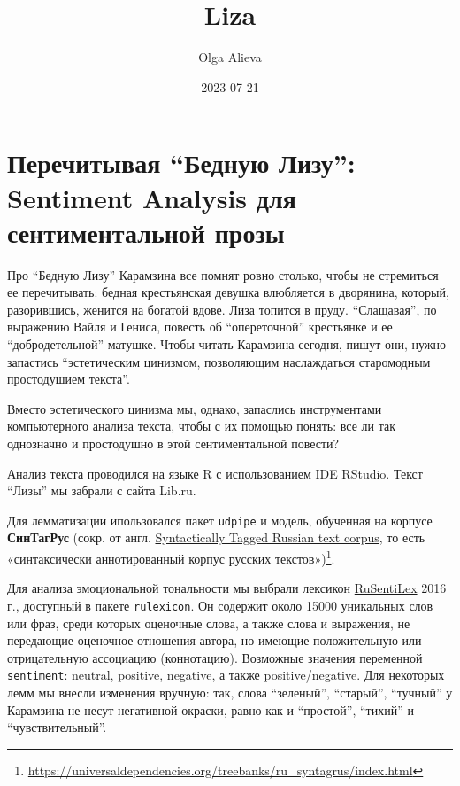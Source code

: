 \documentclass[
]{article}
\title{Liza}
\author{Olga Alieva}
\date{2023-07-21}
\begin{document}
\maketitle

\hypertarget{ux43fux435ux440ux435ux447ux438ux442ux44bux432ux430ux44f-ux431ux435ux434ux43dux443ux44e-ux43bux438ux437ux443-sentiment-analysis-ux434ux43bux44f-ux441ux435ux43dux442ux438ux43cux435ux43dux442ux430ux43bux44cux43dux43eux439-ux43fux440ux43eux437ux44b}{%
\section{Перечитывая ``Бедную Лизу'': Sentiment Analysis для
сентиментальной
прозы}\label{ux43fux435ux440ux435ux447ux438ux442ux44bux432ux430ux44f-ux431ux435ux434ux43dux443ux44e-ux43bux438ux437ux443-sentiment-analysis-ux434ux43bux44f-ux441ux435ux43dux442ux438ux43cux435ux43dux442ux430ux43bux44cux43dux43eux439-ux43fux440ux43eux437ux44b}}

Про ``Бедную Лизу'' Карамзина все помнят ровно столько, чтобы не
стремиться ее перечитывать: бедная крестьянская девушка влюбляется в
дворянина, который, разорившись, женится на богатой вдове. Лиза топится
в пруду. ``Слащавая'', по выражению Вайля и Гениса, повесть об
``опереточной'' крестьянке и ее ``добродетельной'' матушке. Чтобы читать
Карамзина сегодня, пишут они, нужно запастись ``эстетическим цинизмом,
позволяющим наслаждаться старомодным простодушием текста''.

Вместо эстетического цинизма мы, однако, запаслись инструментами
компьютерного анализа текста, чтобы с их помощью понять: все ли так
однозначно и простодушно в этой сентиментальной повести?

Анализ текста проводился на языке R с использованием IDE RStudio. Текст
``Лизы'' мы забрали с сайта Lib.ru.

Для лемматизации ипользовался пакет \texttt{udpipe} и модель, обученная
на корпусе \textbf{СинТагРус} (сокр. от англ.
\href{https://urlis.net/2yqwwngu}{Syntactically Tagged Russian text
corpus}, то есть «синтаксически аннотированный корпус русских
текстов»)\footnote{\url{https://universaldependencies.org/treebanks/ru_syntagrus/index.html}}.

Для анализа эмоциональной тональности мы выбрали лексикон
\href{https://www.labinform.ru/pub/rusentilex/index.htm}{RuSentiLex}
2016 г., доступный в пакете \texttt{rulexicon}. Он содержит около 15000
уникальных слов или фраз, среди которых оценочные слова, а также слова и
выражения, не передающие оценочное отношения автора, но имеющие
положительную или отрицательную ассоциацию (коннотацию). Возможные
значения переменной \texttt{sentiment}: neutral, positive, negative, а
также positive/negative. Для некоторых лемм мы внесли изменения вручную:
так, слова ``зеленый'', ``старый'', ``тучный'' у Карамзина не несут
негативной окраски, равно как и ``простой'', ``тихий'' и
``чувствительный''.
\end{document}
